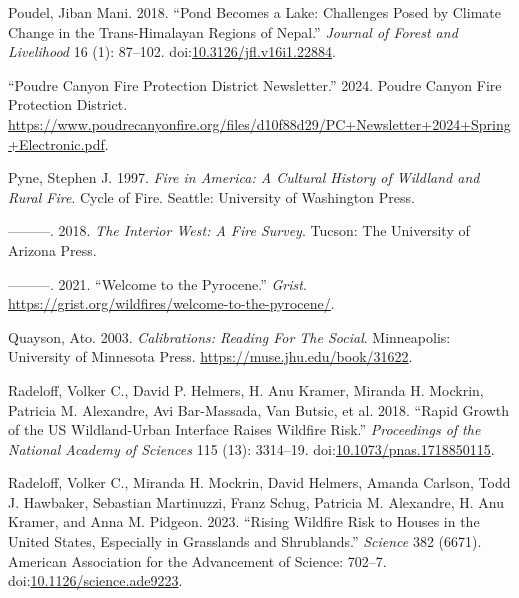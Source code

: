 \documentclass[
]{article}
\newlength{\cslhangindent}
\newenvironment{CSLReferences}[2] %
 {\begin{list}{}{%
  \setlength{\itemindent}{0pt}
  \setlength{\leftmargin}{0pt}
  \setlength{\parsep}{0pt}
  \ifodd #1
   \setlength{\leftmargin}{\cslhangindent}
   \setlength{\itemindent}{-1\cslhangindent}
  \fi
  \setlength{\itemsep}{#2\baselineskip}}}
 {\end{list}}
\begin{document}
\begin{CSLReferences}{1}{0}
Poudel, Jiban Mani. 2018. {``Pond {Becomes} a {Lake}: {Challenges Posed} by {Climate Change} in the {Trans-Himalayan Regions} of {Nepal}.''} \emph{Journal of Forest and Livelihood} 16 (1): 87--102. doi:\href{https://doi.org/10.3126/jfl.v16i1.22884}{10.3126/jfl.v16i1.22884}.

{``Poudre {Canyon Fire Protection District Newsletter}.''} 2024. Poudre Canyon Fire Protection District. \url{https://www.poudrecanyonfire.org/files/d10f88d29/PC+Newsletter+2024+Spring+Electronic.pdf}.

Pyne, Stephen J. 1997. \emph{Fire in {America}: A Cultural History of Wildland and Rural Fire}. Cycle of Fire. Seattle: University of Washington Press.

---------. 2018. \emph{The {Interior West}: {A Fire Survey}}. Tucson: The University of Arizona Press.

---------. 2021. {``Welcome to the {Pyrocene}.''} \emph{Grist}. \url{https://grist.org/wildfires/welcome-to-the-pyrocene/}.

Quayson, Ato. 2003. \emph{Calibrations: {Reading For The Social}}. Minneapolis: University of Minnesota Press. \url{https://muse.jhu.edu/book/31622}.

Radeloff, Volker C., David P. Helmers, H. Anu Kramer, Miranda H. Mockrin, Patricia M. Alexandre, Avi Bar-Massada, Van Butsic, et al. 2018. {``Rapid Growth of the {US} Wildland-Urban Interface Raises Wildfire Risk.''} \emph{Proceedings of the National Academy of Sciences} 115 (13): 3314--19. doi:\href{https://doi.org/10.1073/pnas.1718850115}{10.1073/pnas.1718850115}.

Radeloff, Volker C., Miranda H. Mockrin, David Helmers, Amanda Carlson, Todd J. Hawbaker, Sebastian Martinuzzi, Franz Schug, Patricia M. Alexandre, H. Anu Kramer, and Anna M. Pidgeon. 2023. {``Rising Wildfire Risk to Houses in the {United States}, Especially in Grasslands and Shrublands.''} \emph{Science} 382 (6671). American Association for the Advancement of Science: 702--7. doi:\href{https://doi.org/10.1126/science.ade9223}{10.1126/science.ade9223}.


\end{CSLReferences}
\end{document}
